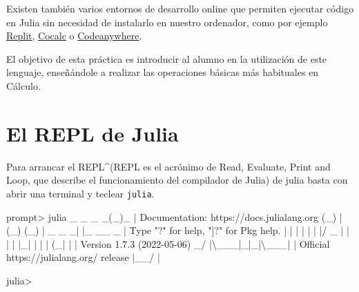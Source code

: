 \documentclass[
  a4paper,
]{scrreport}
\newenvironment{Shaded}{\begin{snugshade}}{\end{snugshade}}
\newcommand{\BuiltInTok}[1]{\textcolor[rgb]{0.00,0.23,0.31}{#1}}
\newcommand{\CharTok}[1]{\textcolor[rgb]{0.13,0.47,0.30}{#1}}
\newcommand{\ControlFlowTok}[1]{\textcolor[rgb]{0.00,0.23,0.31}{#1}}
\newcommand{\DataTypeTok}[1]{\textcolor[rgb]{0.68,0.00,0.00}{#1}}
\newcommand{\FloatTok}[1]{\textcolor[rgb]{0.68,0.00,0.00}{#1}}
\newcommand{\FunctionTok}[1]{\textcolor[rgb]{0.28,0.35,0.67}{#1}}
\newcommand{\NormalTok}[1]{\textcolor[rgb]{0.00,0.23,0.31}{#1}}
\newcommand{\OperatorTok}[1]{\textcolor[rgb]{0.37,0.37,0.37}{#1}}
\newcommand{\SpecialStringTok}[1]{\textcolor[rgb]{0.13,0.47,0.30}{#1}}
\newcommand{\StringTok}[1]{\textcolor[rgb]{0.13,0.47,0.30}{#1}}
\theoremstyle{definition}
\theoremstyle{remark}
\begin{document}
Existen también varios entornos de desarrollo online que permiten
ejecutar código en Julia sin necesidad de instalarlo en nuestro
ordenador, como por ejemplo
\href{https://replit.com/languages/julia}{Replit},
\href{https://cocalc.com/}{Cocalc} o
\href{https://codeanywhere.com/languages/julia}{Codeanywhere}.

El objetivo de esta práctica es introducir al alumno en la utilización
de este lenguaje, enseñándole a realizar las operaciones básicas más
habituales en Cálculo.

\hypertarget{el-repl-de-julia}{%
\section{El REPL de Julia}\label{el-repl-de-julia}}

Para arrancar el REPL\^{}(REPL es el acrónimo de Read, Evaluate, Print
and Loop, que describe el funcionamiento del compilador de Julia) de
julia basta con abrir una terminal y teclear \texttt{julia}.

\begin{Shaded}
\begin{Highlighting}[]
\NormalTok{prompt}\OperatorTok{\textgreater{}}\NormalTok{ julia}
\NormalTok{               \_}
\NormalTok{   \_       \_ }\FunctionTok{\_}\NormalTok{(\_)\_     }\OperatorTok{|}\NormalTok{  Documentation}\OperatorTok{:}\NormalTok{ https}\OperatorTok{://}\NormalTok{docs.julialang.org}
\NormalTok{  (\_)     }\OperatorTok{|}\NormalTok{ (\_) (\_)    }\OperatorTok{|}
\NormalTok{   \_ \_   \_}\OperatorTok{|} \OperatorTok{|}\NormalTok{\_  \_\_ \_   }\OperatorTok{|}  \DataTypeTok{Type} \StringTok{"?"} \ControlFlowTok{for}\NormalTok{ help, }\StringTok{"]?"} \ControlFlowTok{for} \BuiltInTok{Pkg}\NormalTok{ help.}
  \OperatorTok{|} \OperatorTok{|} \OperatorTok{|} \OperatorTok{|} \OperatorTok{|} \OperatorTok{|} \OperatorTok{|/}\NormalTok{ \_}\SpecialStringTok{\textasciigrave{} |  |}
  \OperatorTok{|} \OperatorTok{|} \OperatorTok{|}\NormalTok{\_}\OperatorTok{|} \OperatorTok{|} \OperatorTok{|} \OperatorTok{|}\NormalTok{ (\_}\OperatorTok{|} \OperatorTok{|}  \OperatorTok{|}\NormalTok{  Version }\FloatTok{1.7.3}\NormalTok{ (}\FloatTok{2022}\OperatorTok{{-}}\FloatTok{05}\OperatorTok{{-}}\FloatTok{06}\NormalTok{)}
\NormalTok{ \_}\OperatorTok{/} \OperatorTok{|\textbackslash{}}\NormalTok{\_\_}\CharTok{\textquotesingle{}\_|\_|\_|\textbackslash{}\_\_\textquotesingle{}}\NormalTok{\_}\OperatorTok{|}  \OperatorTok{|}\NormalTok{  Official https}\OperatorTok{://}\NormalTok{julialang.org}\OperatorTok{/}\NormalTok{ release}
\OperatorTok{|}\NormalTok{\_\_}\OperatorTok{/}                   \OperatorTok{|}

\NormalTok{julia}\OperatorTok{\textgreater{}}
\end{Highlighting}
\end{Shaded}
\end{document}
